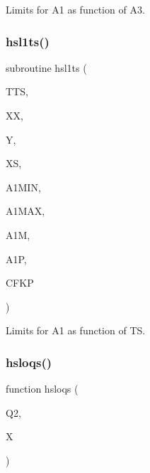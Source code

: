 Limits for A1 as function of A3. 

\mbox{\label{djangoh__h_8f_ace5a98ed477cad1bb311954ce4a0ad57}} 
\subsubsection{\texorpdfstring{hsl1ts()}{hsl1ts()}}
{\footnotesize\ttfamily subroutine hsl1ts (\begin{DoxyParamCaption}\item[{}]{T\+TS,  }\item[{}]{XX,  }\item[{}]{Y,  }\item[{}]{XS,  }\item[{}]{A1\+M\+IN,  }\item[{}]{A1\+M\+AX,  }\item[{}]{A1M,  }\item[{}]{A1P,  }\item[{}]{C\+F\+KP }\end{DoxyParamCaption})}



Limits for A1 as function of TS. 

\mbox{\label{djangoh__h_8f_a60a33b63a3b4ec4bdfaf4a68935b607d}} 
\subsubsection{\texorpdfstring{hsloqs()}{hsloqs()}}
{\footnotesize\ttfamily function hsloqs (\begin{DoxyParamCaption}\item[{}]{Q2,  }\item[{}]{X }\end{DoxyParamCaption})}

\mbox{\label{djangoh__h_8f_ae4db38c1fc3b0a5dc77baf9d22e21aee}} 
